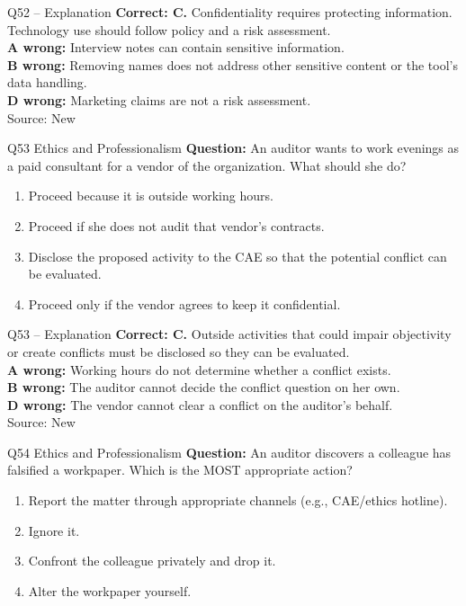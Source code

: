 \documentclass[aspectratio=169,10pt]{beamer}
\begin{document}
\begin{frame}[t]{Q52 -- Explanation}
	\footnotesize
	\textbf{Correct: C.} Confidentiality requires protecting information. Technology use should follow policy and a risk assessment. \\[5pt]
\textbf{A wrong:} Interview notes can contain sensitive information. \\[3pt]
\textbf{B wrong:} Removing names does not address other sensitive content or the tool's data handling. \\[3pt]
\textbf{D wrong:} Marketing claims are not a risk assessment. \\[3pt]
	\vfill {\tiny Source: New}
\end{frame}

\begin{frame}[t]{Q53 \hfill {\scriptsize Ethics and Professionalism}}
	\small
	\textbf{Question:} An auditor wants to work evenings as a paid consultant for a vendor of the organization. What should she do?
	\begin{enumerate}[label=\Alph*.,itemsep=1pt,topsep=3pt]
			\item Proceed because it is outside working hours.
			\item Proceed if she does not audit that vendor's contracts.
			\item Disclose the proposed activity to the CAE so that the potential conflict can be evaluated.
			\item Proceed only if the vendor agrees to keep it confidential.
	\end{enumerate}
\end{frame}

\begin{frame}[t]{Q53 -- Explanation}
	\footnotesize
	\textbf{Correct: C.} Outside activities that could impair objectivity or create conflicts must be disclosed so they can be evaluated. \\[5pt]
\textbf{A wrong:} Working hours do not determine whether a conflict exists. \\[3pt]
\textbf{B wrong:} The auditor cannot decide the conflict question on her own. \\[3pt]
\textbf{D wrong:} The vendor cannot clear a conflict on the auditor's behalf. \\[3pt]
	\vfill {\tiny Source: New}
\end{frame}

\begin{frame}[t]{Q54 \hfill {\scriptsize Ethics and Professionalism}}
	\small
	\textbf{Question:} An auditor discovers a colleague has falsified a workpaper. Which is the MOST appropriate action?
	\begin{enumerate}[label=\Alph*.,itemsep=1pt,topsep=3pt]
			\item Report the matter through appropriate channels (e.g., CAE/ethics hotline).
			\item Ignore it.
			\item Confront the colleague privately and drop it.
			\item Alter the workpaper yourself.
	\end{enumerate}
\end{frame}
\end{document}
